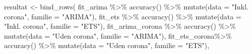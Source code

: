 \documentclass[
  danish,
]{article}
\newenvironment{Shaded}{\begin{snugshade}}{\end{snugshade}}
\newcommand{\AttributeTok}[1]{\textcolor[rgb]{0.40,0.45,0.13}{#1}}
\newcommand{\FunctionTok}[1]{\textcolor[rgb]{0.28,0.35,0.67}{#1}}
\newcommand{\NormalTok}[1]{\textcolor[rgb]{0.00,0.23,0.31}{#1}}
\newcommand{\OtherTok}[1]{\textcolor[rgb]{0.00,0.23,0.31}{#1}}
\newcommand{\SpecialCharTok}[1]{\textcolor[rgb]{0.37,0.37,0.37}{#1}}
\newcommand{\StringTok}[1]{\textcolor[rgb]{0.13,0.47,0.30}{#1}}
\begin{document}
\begin{Shaded}
\begin{Highlighting}[]
\NormalTok{resultat }\OtherTok{\textless{}{-}} \FunctionTok{bind\_rows}\NormalTok{(}
\NormalTok{  fit\_arima }\SpecialCharTok{\%\textgreater{}\%} 
    \FunctionTok{accuracy}\NormalTok{() }\SpecialCharTok{\%\textgreater{}\%}
    \FunctionTok{mutate}\NormalTok{(}\AttributeTok{data =} \StringTok{"Inkl. corona"}\NormalTok{, }\AttributeTok{familie =} \StringTok{"ARIMA"}\NormalTok{),}
\NormalTok{  fit\_ets }\SpecialCharTok{\%\textgreater{}\%} 
    \FunctionTok{accuracy}\NormalTok{() }\SpecialCharTok{\%\textgreater{}\%} 
    \FunctionTok{mutate}\NormalTok{(}\AttributeTok{data =} \StringTok{"Inkl. corona"}\NormalTok{, }\AttributeTok{familie =} \StringTok{"ETS"}\NormalTok{),}
\NormalTok{  fit\_arima\_corona }\SpecialCharTok{\%\textgreater{}\%} 
    \FunctionTok{accuracy}\NormalTok{() }\SpecialCharTok{\%\textgreater{}\%} 
    \FunctionTok{mutate}\NormalTok{(}\AttributeTok{data =} \StringTok{"Uden corona"}\NormalTok{, }\AttributeTok{familie =} \StringTok{"ARIMA"}\NormalTok{),}
\NormalTok{  fit\_ets\_corona}\SpecialCharTok{\%\textgreater{}\%} 
    \FunctionTok{accuracy}\NormalTok{() }\SpecialCharTok{\%\textgreater{}\%} 
    \FunctionTok{mutate}\NormalTok{(}\AttributeTok{data =} \StringTok{"Uden corona"}\NormalTok{, }\AttributeTok{familie =} \StringTok{"ETS"}\NormalTok{),}
  

\end{Highlighting}
\end{Shaded}
\end{document}
